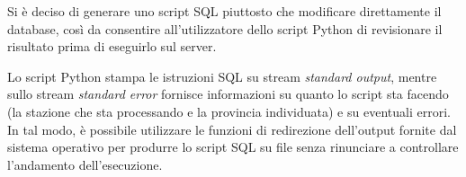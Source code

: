 Si è deciso di generare uno script SQL piuttosto che modificare direttamente il
database, così da consentire all'utilizzatore dello script Python di revisionare
il risultato prima di eseguirlo sul server.

Lo script Python stampa le istruzioni SQL su stream \textit{standard output},
mentre sullo stream \textit{standard error} fornisce informazioni su quanto lo
script sta facendo (la stazione che sta processando e la provincia individuata)
e su eventuali errori.  In tal modo, è possibile utilizzare le funzioni di
redirezione dell'output fornite dal sistema operativo per produrre lo script SQL
su file senza rinunciare a controllare l'andamento dell'esecuzione.
